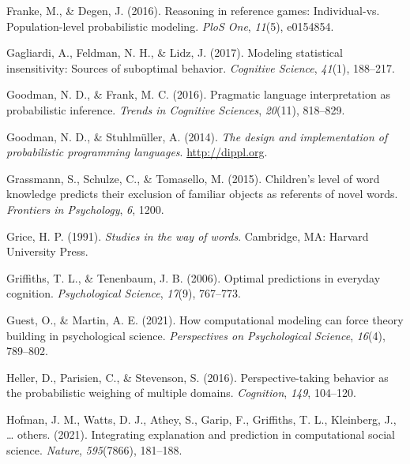 \documentclass[
  man,mask,floatsintext]{apa6}
\newlength{\cslhangindent}
\newlength{\cslentryspacingunit} %
\newenvironment{CSLReferences}[2] %
 {%
  \setlength{\parindent}{0pt}
  \ifodd #1
  \let\oldpar\par
  \def\par{\hangindent=\cslhangindent\oldpar}
  \fi
  \setlength{\parskip}{#2\cslentryspacingunit}
 }%
 {}
\begin{document}
\begin{CSLReferences}{1}{0}
\leavevmode{}%
Franke, M., \& Degen, J. (2016). Reasoning in reference games: Individual-vs. Population-level probabilistic modeling. \emph{PloS One}, \emph{11}(5), e0154854.

\leavevmode{}%
Gagliardi, A., Feldman, N. H., \& Lidz, J. (2017). Modeling statistical insensitivity: Sources of suboptimal behavior. \emph{Cognitive Science}, \emph{41}(1), 188--217.

\leavevmode{}%
Goodman, N. D., \& Frank, M. C. (2016). Pragmatic language interpretation as probabilistic inference. \emph{Trends in Cognitive Sciences}, \emph{20}(11), 818--829.

\leavevmode{}%
Goodman, N. D., \& Stuhlmüller, A. (2014). \emph{{The design and implementation of probabilistic programming languages}}. \url{http://dippl.org}.

\leavevmode{}%
Grassmann, S., Schulze, C., \& Tomasello, M. (2015). Children's level of word knowledge predicts their exclusion of familiar objects as referents of novel words. \emph{Frontiers in Psychology}, \emph{6}, 1200.

\leavevmode{}%
Grice, H. P. (1991). \emph{Studies in the way of words}. Cambridge, MA: Harvard University Press.

\leavevmode{}%
Griffiths, T. L., \& Tenenbaum, J. B. (2006). Optimal predictions in everyday cognition. \emph{Psychological Science}, \emph{17}(9), 767--773.

\leavevmode{}%
Guest, O., \& Martin, A. E. (2021). How computational modeling can force theory building in psychological science. \emph{Perspectives on Psychological Science}, \emph{16}(4), 789--802.

\leavevmode{}%
Heller, D., Parisien, C., \& Stevenson, S. (2016). Perspective-taking behavior as the probabilistic weighing of multiple domains. \emph{Cognition}, \emph{149}, 104--120.

\leavevmode{}%
Hofman, J. M., Watts, D. J., Athey, S., Garip, F., Griffiths, T. L., Kleinberg, J., \ldots{} others. (2021). Integrating explanation and prediction in computational social science. \emph{Nature}, \emph{595}(7866), 181--188.


\end{CSLReferences}
\end{document}
